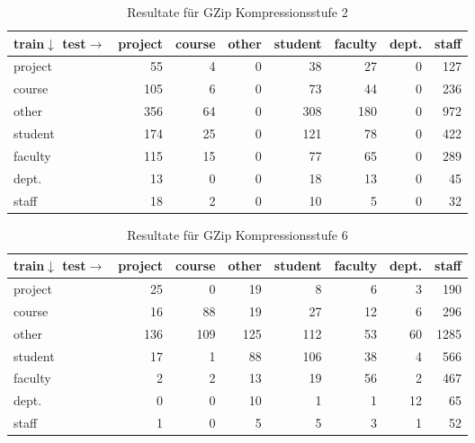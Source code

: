 \begin{frame}[c]
\begin{itemize}
  \begin{table}[htbp]
\caption{Resultate für GZip Kompressionsstufe 2}
\begin{tabular}{|l|r|r|r|r|r|r|r|}
\hline
train$\downarrow$ test$\rightarrow$& \multicolumn{1}{l|}{project} & \multicolumn{1}{l|}{course} &
\multicolumn{1}{l|}{other} & \multicolumn{1}{l|}{student} &
\multicolumn{1}{l|}{faculty} & \multicolumn{1}{l|}{dept.} &
\multicolumn{1}{l|}{staff} \\ \hline project & 55 & 4 & 0 & 38 & 27 & 0 & 127 \\ \hline course & 105 & 6 & 0 & 73 & 44 & 0 & 236 \\ \hline other & 356 & 64 & 0 & 308 & 180 & 0 & 972 \\ \hline
student & 174 & 25 & 0 & 121 & 78 & 0 & 422 \\ \hline
faculty & 115 & 15 & 0 & 77 & 65 & 0 & 289 \\ \hline
dept. & 13 & 0 & 0 & 18 & 13 & 0 & 45 \\ \hline
staff & 18 & 2 & 0 & 10 & 5 & 0 & 32 \\ \hline
\end{tabular}
\label{tbl:GzipL2}
\end{table}
  
   
\end{itemize}
\end{frame}

\begin{frame}[c]
\begin{itemize}
  \begin{table}[htbp]
\caption{Resultate für GZip Kompressionsstufe 6}
\begin{tabular}{|l|r|r|r|r|r|r|r|}
\hline
train$\downarrow$ test$\rightarrow$& \multicolumn{1}{l|}{project} & \multicolumn{1}{l|}{course} &
\multicolumn{1}{l|}{other} & \multicolumn{1}{l|}{student} &
\multicolumn{1}{l|}{faculty} & \multicolumn{1}{l|}{dept.} &
\multicolumn{1}{l|}{staff} \\ \hline project & 25 & 0 & 19 & 8 & 6 & 3 & 190 \\ \hline course & 16 & 88 & 19 & 27 & 12 & 6 & 296 \\ \hline other & 136 & 109 & 125 & 112 & 53 & 60 & 1285 \\ \hline
student & 17 & 1 & 88 & 106 & 38 & 4 & 566 \\ \hline
faculty & 2 & 2 & 13 & 19 & 56 & 2 & 467 \\ \hline
dept. & 0 & 0 & 10 & 1 & 1 & 12 & 65 \\ \hline
staff & 1 & 0 & 5 & 5 & 3 & 1 & 52 \\ \hline
\end{tabular}
\label{tbl:GzipL6}
\end{table}
  
  
   
\end{itemize}
\end{frame}

